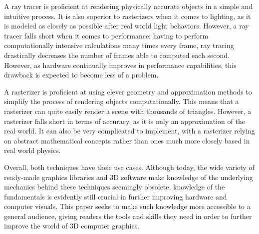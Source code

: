 \documentclass[a4paper]{article}
\begin{document}
A ray tracer is proficient at rendering physically accurate objects in a simple and intuitive process. It is also superior to rasterizers when it comes to lighting, as it is modeled as closely as possible after real world light behaviors. However, a ray tracer falls short when it comes to performance; having to perform computationally intensive calculations many times every frame, ray tracing drastically decreases the number of frames able to computed each second. However, as hardware continually improves in performance capabilities, this drawback is expected to become less of a problem.

A rasterizer is proficient at using clever geometry and approximation methods to simplify the process of rendering objects computationally. This means that a rasterizer can quite easily render a scene with thousands of triangles. However, a rasterizer falls short in terms of accuracy, as it is only an approximation of the real world. It can also be very complicated to implement, with a rasterizer relying on abstract mathematical concepts rather than ones much more closely based in real world physics.

Overall, both techniques have their use cases. Although today, the wide variety of ready-made graphics libraries and 3D software make knowledge of the underlying mechanics behind these techniques seemingly obsolete, knowledge of the fundamentals is evidently still crucial in further improving hardware and computer visuals. This paper seeks to make such knowledge more accessible to a general audience, giving readers the tools and skills they need in order to further improve the world of 3D computer graphics.

\printbibliography{}
\end{document}
